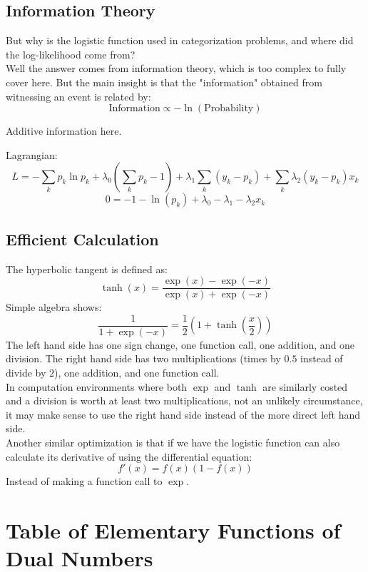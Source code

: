 \subsection{Information Theory}
But why is the logistic function used in categorization problems,
and where did the log-likelihood come from?
\\

Well the answer comes from information theory,
which is too complex to fully cover here.
But the main insight is that the "information" obtained from witnessing an event is related by:
\[\text{Information} \propto -\ln(\text{Probability})\]

Additive information here.

Lagrangian:
\[L = -\sum_kp_k\ln p_k+\lambda_0\left(\sum_k p_k - 1\right) + \lambda_1\sum_k (y_k-p_k) + \sum_k\lambda_2(y_k-p_k)x_k\]
\[ 0 = -1-\ln(p_k) +\lambda_0 -\lambda_1-\lambda_2x_k\]

\subsection{Efficient Calculation}
The hyperbolic tangent is defined as:
\[\tanh(x) = \frac{\exp(x)-\exp(-x)}{\exp(x)+\exp(-x)}\]
Simple algebra shows:
\[\frac{1}{1+\exp(-x)} = \frac{1}{2}\left(1+\tanh\left(\frac{x}{2}\right)\right)\]
The left hand side has one sign change, one function call, one addition, and one division.
The right hand side has two multiplications (times by $0.5$ instead of divide by $2$), one addition, and one function call.
\\

In computation environments where both $\exp$ and $\tanh$ are similarly costed and a division is worth at least two multiplications,
not an unlikely circumstance, 
it may make sense to use the right hand side instead of the more direct left hand side.
\\

Another similar optimization is that if we have the logistic function can also calculate its derivative of using the differential equation:
\[f'(x) = f(x)(1-f(x))\]
Instead of making a function call to $\exp$. 

\section{Table of Elementary Functions of Dual Numbers}
